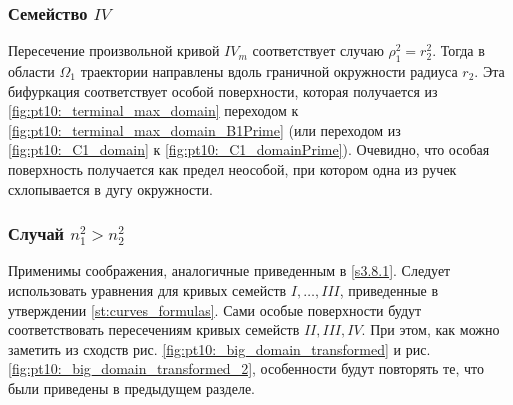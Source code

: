  \subsubsection{Семейство $IV$}
Пересечение произвольной кривой $IV_m$ соответствует случаю $\rho_1^2 = r_2^2$. Тогда в области $\Omega_1$ траектории направлены вдоль граничной окружности радиуса $r_2$. Эта бифуркация соответствует особой поверхности, которая получается из \ref{fig:pt10:_terminal_max_domain} переходом к \ref{fig:pt10:_terminal_max_domain_B1Prime} (или переходом из \ref{fig:pt10:_C1_domain} к \ref{fig:pt10:_C1_domainPrime}). Очевидно, что особая поверхность получается как предел неособой, при котором одна из ручек схлопывается в дугу окружности.


\subsubsection{Случай $n_1^2 > n_2^2$}
Применимы соображения, аналогичные приведенным в \ref{s3.8.1}. Следует использовать уравнения для кривых семейств $I, \ldots, III$, приведенные в утверждении \ref{st:curves_formulas}. Сами особые поверхности будут соответствовать пересечениям кривых семейств $II, III, IV$. При этом, как можно заметить из сходств рис. \ref{fig:pt10:_big_domain_transformed} и  рис. \ref{fig:pt10:_big_domain_transformed_2}, особенности будут повторять те, что были  приведены в предыдущем разделе.
